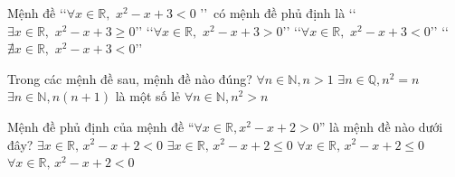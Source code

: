 

\begin{ex}%
	Mệnh  đề \lq\lq $\forall x\in \mathbb{R},\,\,x^2-x+3<0$ \rq\rq\, có mệnh đề phủ định là
	\choice 
		{\True \lq\lq $\exists x  \in \mathbb{R},\,\,x^2-x+3\ge 0$\rq\rq}
		 {\lq\lq $\forall x \in \mathbb{R},\,\,x^2-x+3>0$\rq\rq}
		 {\lq\lq $\forall x \in \mathbb{R},\,\,x^2-x+3<0$\rq\rq}
		{\lq\lq $\nexists  x \in \mathbb{R},\,\,x^2-x+3<0$\rq\rq}
\end{ex}

\begin{ex}%
	Trong các mệnh đề sau, mệnh đề nào đúng? 
	 \choice
		{$\forall n\in  \mathbb{N}, n > 1$}
		{\True $\exists n\in  \mathbb{Q}, n^2=n$}
		{$\exists n\in  \mathbb{N}, n\left(n+1\right)$ là một số lẻ}
		{$\forall n\in \mathbb{N}, n^2>  n$}
\end{ex}

\begin{ex}%
	Mệnh đề phủ định của mệnh đề “$\forall  x\in\mathbb{R},x^2-x+2>0$” là mệnh đề nào dưới đây?
	 \choice
		{$\exists  x\in\mathbb{R},\,x^2-x+2<0$}
		{\True $\exists x\in\mathbb{R},\,x^2-x+2\le  0$}
		{$\forall  x\in\mathbb{R},\,x^2-x+2\le 0$}
		{$\forall  x\in\mathbb{R},\,x^2-x+2<0$}
\end{ex}

